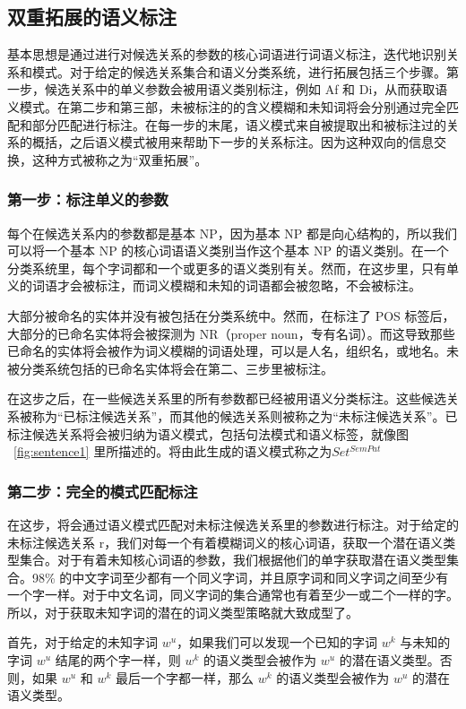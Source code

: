 \subsection{双重拓展的语义标注}
基本思想是通过进行对候选关系的参数的核心词语进行词语义标注，迭代地识别关系和模式。对于给定的候选关系集合和语义分类系统，进行拓展包括三个步骤。第一步，候选关系中的单义参数会被用语义类别标注，例如 Af 和 Di，从而获取语义模式。在第二步和第三部，未被标注的的含义模糊和未知词将会分别通过完全匹配和部分匹配进行标注。在每一步的末尾，语义模式来自被提取出和被标注过的关系的概括，之后语义模式被用来帮助下一步的关系标注。因为这种双向的信息交换，这种方式被称之为“双重拓展”。

\subsubsection{第一步：标注单义的参数}
每个在候选关系内的参数都是基本 NP，因为基本 NP 都是向心结构的\citep{endocentric2017}，所以我们可以将一个基本 NP 的核心词语语义类别当作这个基本 NP 的语义类别。在一个分类系统里，每个字词都和一个或更多的语义类别有关。然而，在这步里，只有单义的词语才会被标注，而词义模糊和未知的词语都会被忽略，不会被标注。

大部分被命名的实体并没有被包括在分类系统中。然而，在标注了 POS 标签后，大部分的已命名实体将会被探测为 NR（proper noun，专有名词）。而这导致那些已命名的实体将会被作为词义模糊的词语处理，可以是人名，组织名，或地名。未被分类系统包括的已命名实体将会在第二、三步里被标注。

在这步之后，在一些候选关系里的所有参数都已经被用语义分类标注。这些候选关系被称为“已标注候选关系”，而其他的候选关系则被称之为“未标注候选关系”。已标注候选关系将会被归纳为语义模式，包括句法模式和语义标签，就像图 ~\ref{fig:sentence1} 里所描述的。将由此生成的语义模式称之为$Set^{SemPat}$

\subsubsection{第二步：完全的模式匹配标注}
在这步，将会通过语义模式匹配对未标注候选关系里的参数进行标注。对于给定的未标注候选关系 r，我们对每一个有着模糊词义的核心词语，获取一个潜在语义类型集合。对于有着未知核心词语的参数，我们根据他们的单字获取潜在语义类型集合。98\% 的中文字词至少都有一个同义字词\citep{qiu2011}，并且原字词和同义字词之间至少有一个字一样。对于中文名词，同义字词的集合通常也有着至少一或二个一样的字。所以，对于获取未知字词的潜在的词义类型策略就大致成型了。

首先，对于给定的未知字词 $w^u$，如果我们可以发现一个已知的字词 $w^k$ 与未知的字词 $w^u$ 结尾的两个字一样，则 $w^k$ 的语义类型会被作为 $w^u$ 的潜在语义类型。否则，如果 $w^u$ 和 $w^k$ 最后一个字都一样，那么 $w^k$ 的语义类型会被作为 $w^u$ 的潜在语义类型。

